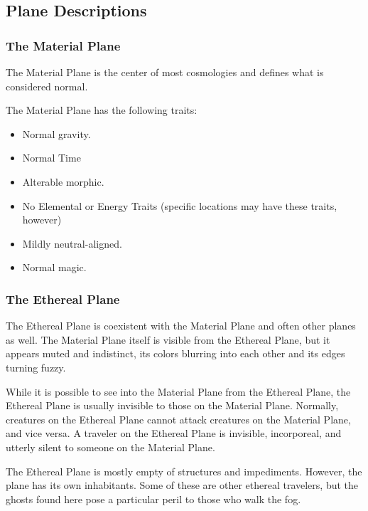 \subsection{Plane Descriptions}

\subsubsection{The Material Plane}

The Material Plane is the center of most cosmologies and defines what is considered 
normal.

The Material Plane has the following traits:

\begin{itemize}
\item Normal gravity.
\item Normal Time
\item Alterable morphic.
\item No Elemental or Energy Traits (specific locations may have these traits, however)
\item Mildly neutral-aligned.
\item Normal magic. 
\end{itemize}

\subsubsection{The Ethereal Plane}

The Ethereal Plane is coexistent with the Material Plane and often other planes 
as well. The Material Plane itself is visible from the Ethereal Plane, but it appears 
muted and indistinct, its colors blurring into each other and its edges turning 
fuzzy.

While it is possible to see into the Material Plane from the Ethereal Plane, the 
Ethereal Plane is usually invisible to those on the Material Plane. Normally, creatures 
on the Ethereal Plane cannot attack creatures on the Material Plane, and vice versa. 
A traveler on the Ethereal Plane is invisible, incorporeal, and utterly silent 
to someone on the Material Plane. 

The Ethereal Plane is mostly empty of structures and impediments. However, the 
plane has its own inhabitants. Some of these are other ethereal travelers, but 
the ghosts found here pose a particular peril to those who walk the fog. 

